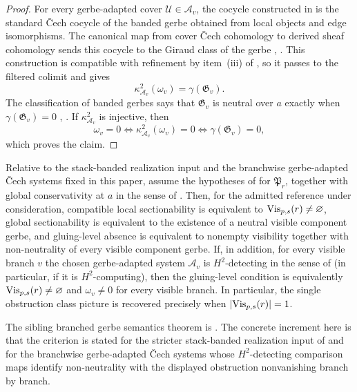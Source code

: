 \begin{proof}
For every gerbe-adapted cover $\mathcal U\in\mathcal A_v$, the cocycle
constructed in  is the standard
\v{C}ech cocycle of the banded gerbe obtained from local objects and edge
isomorphisms. The canonical map from cover \v{C}ech cohomology to derived
sheaf cohomology sends this cocycle to the Giraud class of the gerbe
\cite[Chap.~IV]{Giraud1971}, \cite[Tag 06NY]{StacksProject}. This construction
is compatible with refinement by item~\textup{(iii)} of
, so it passes to the filtered
colimit and gives
\[
\kappa^2_{\mathcal A_v}(\omega_v)=\gamma(\mathfrak G_v).
\]
The classification of banded gerbes says that $\mathfrak G_v$ is neutral over
$a$ exactly when $\gamma(\mathfrak G_v)=0$
\cite[Chap.~IV]{Giraud1971}, \cite[Tag 06NY]{StacksProject}. If
$\kappa^2_{\mathcal A_v}$ is injective, then
\[
\omega_v=0
\Longleftrightarrow
\kappa^2_{\mathcal A_v}(\omega_v)=0
\Longleftrightarrow
\gamma(\mathfrak G_v)=0,
\]
which proves the claim.
\end{proof}

\begin{theorem}\label{thm:gerbe-null-semantics}
Relative to the stack-banded realization input and the branchwise
gerbe-adapted \v{C}ech systems fixed in this paper, assume the hypotheses of
 for $\mathfrak P_r$, together with global
conservativity at $a$ in the sense of . Then,
for the admitted reference under consideration, compatible local sectionability
is equivalent to $\mathrm{Vis}_{p,s}(r)\neq\varnothing$, global sectionability is
equivalent to the existence of a neutral visible component gerbe, and
gluing-level absence is equivalent to nonempty visibility together with
non-neutrality of every visible component gerbe. If, in addition, for every
visible branch $v$ the chosen gerbe-adapted system
$\mathcal A_v$ is $H^2$-detecting in the sense of
 (in particular, if it is
$H^2$-computing), then the gluing-level condition is equivalently
$\mathrm{Vis}_{p,s}(r)\neq\varnothing$ and $\omega_v\neq 0$ for every visible branch.
In particular, the single obstruction class picture is recovered precisely when $|\mathrm{Vis}_{p,s}(r)|=1$.
\end{theorem}

\begin{remark}
The sibling branched gerbe semantics theorem is
\cite[Theorem~5.10]{HomologicalVisibilityGluingObstructions2026}. The concrete
increment here is that the criterion is stated for the stricter stack-banded
realization input of  and for the branchwise
gerbe-adapted \v{C}ech systems whose $H^2$-detecting comparison maps identify
non-neutrality with the displayed obstruction nonvanishing branch by branch.
\end{remark}

